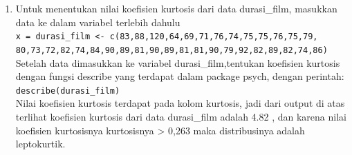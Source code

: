 \documentclass[a4paper,12pt]{article}
\begin{document}
\begin{enumerate}[label=\alph*.]
	\item Untuk menentukan nilai koefisien kurtosis dari data durasi\_film, masukkan data ke dalam variabel terlebih dahulu\\
	\texttt{x = durasi\_film <- c(83,88,120,64,69,71,76,74,75,75,76,75,79,\\
		80,73,72,82,74,84,90,89,81,90,89,81,81,90,79,92,82,89,82,74,86)\\}
	Setelah data dimasukkan ke variabel durasi\_film,tentukan koefisien kurtosis dengan fungsi describe yang terdapat dalam package psych, dengan perintah:\\
	\texttt{describe(durasi\_film)}\\
	Nilai koefisien kurtosis terdapat pada kolom kurtosis, jadi dari output di atas terlihat koefisien kurtosis dari data durasi\_film adalah 4.82 , dan karena nilai koefisien kurtosisnya kurtosisnya > 0,263 maka distribusinya adalah leptokurtik. 
\end{enumerate}
\end{document}

